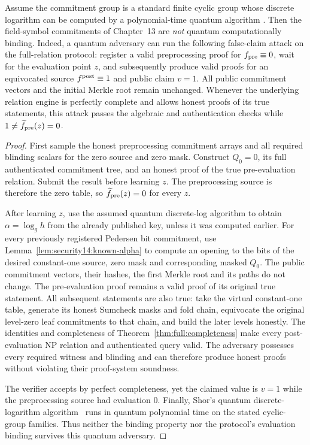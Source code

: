 \begin{theorem}\label{thm:security14:quantum-break}
Assume the commitment group is a
standard finite cyclic group
whose discrete logarithm can
be computed by a polynomial-time
quantum algorithm
\cite{Shor1997}.
Then the field-symbol
commitments of Chapter~13
are \emph{not} quantum
computationally binding.
Indeed, a quantum adversary
can run the following
false-claim attack on the
full-relation protocol:
register a valid preprocessing
proof for $f_{\rm pre}\equiv0$,
wait for the evaluation point
$z$, and subsequently produce
valid proofs for an equivocated
source $f^{\rm post}\equiv1$
and public claim $v=1$.
All public commitment vectors
and the initial Merkle root
remain unchanged. Whenever the
underlying relation engine is
perfectly complete and allows
honest proofs of its true
statements, this attack
passes the algebraic and
authentication checks while
$1\neq\widetilde f_{\rm pre}(z)=0$.
\end{theorem}
\begin{proof}
First sample the honest
preprocessing commitment
arrays and all required
blinding scalars for the
zero source and zero mask.
Construct $Q_0=0$, its
full authenticated
commitment tree, and
an honest proof of the
true pre-evaluation
relation. Submit the
result before learning $z$.
The preprocessing source
is therefore the zero
table, so
$\widetilde f_{\rm pre}(z)=0$
for every $z$.

After learning $z$,
use the assumed quantum
discrete-log algorithm to
obtain
$\alpha=\log_g h$
from the already published
key, unless it was computed
earlier. For every previously
registered Pedersen bit
commitment, use
Lemma~\ref{lem:security14:known-alpha}
to compute an opening to
the bits of the desired
constant-one source,
zero mask and corresponding
masked $Q_0$. The public
commitment vectors, their
hashes, the first Merkle
root and its paths
do not change.
The pre-evaluation proof
remains a valid proof of
its original true
statement. All subsequent
statements are also true:
take the virtual
constant-one table,
generate its honest
Sumcheck masks and
fold chain, equivocate
the original level-zero
leaf commitments to
that chain, and build
the later levels
honestly.
The identities and
completeness of
Theorem~\ref{thm:full:completeness}
make every post-evaluation
NP relation and
authenticated query valid.
The adversary possesses
every required witness
and blinding and can
therefore produce honest
proofs without violating
their proof-system
soundness.

The verifier accepts
by perfect completeness,
yet the claimed value
is $v=1$ while the
preprocessing source
had evaluation $0$.
Finally, Shor's
quantum discrete-logarithm
algorithm~\cite{Shor1997}
runs in quantum
polynomial time on the
stated cyclic-group
families. Thus neither
the binding property
nor the protocol's
evaluation binding
survives this quantum
adversary.
\end{proof}

